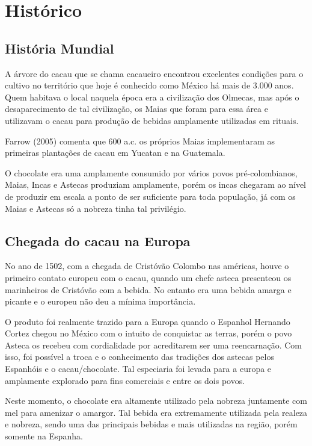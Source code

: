 \documentclass[
	12pt,				%
	openright,			%
	oneside,			%
	a4paper,			%
	english,			%
	french,				%
	spanish,			%
	brazil				%
	]{abntex2}
\begin{document}
\section{Histórico}

\subsection{História Mundial}

A árvore do cacau que se chama cacaueiro encontrou excelentes condições para o cultivo no território que hoje é conhecido como México há mais de 3.000 anos. Quem habitava o local naquela época era a civilização dos Olmecas, mas após o desaparecimento de tal civilização, os Maias que foram para essa área e utilizavam o cacau para produção de bebidas amplamente utilizadas em rituais. \cite{7}

Farrow (2005) comenta que 600 a.c. os próprios Maias implementaram as primeiras plantações de cacau em Yucatan e na Guatemala. \cite{7}

O chocolate era uma amplamente consumido por vários povos pré-colombianos, Maias, Incas e Astecas produziam amplamente, porém os incas chegaram ao nível de produzir em escala a ponto de ser suficiente para toda população, já com os Maias e Astecas só a nobreza tinha tal privilégio. 

\subsection{Chegada do cacau na Europa}

No ano de 1502, com a chegada de Cristóvão Colombo nas américas, houve o primeiro contato europeu com o cacau, quando um chefe asteca presenteou os marinheiros de Cristóvão com a bebida. No entanto era uma bebida amarga e picante e o europeu não deu a mínima importância. \cite{7}

O produto foi realmente trazido para a Europa quando o Espanhol Hernando Cortez chegou no México com o intuito de conquistar as terras, porém o povo Asteca os recebeu com cordialidade por acreditarem ser uma reencarnação. Com isso, foi possível a troca e o conhecimento das tradições dos astecas pelos Espanhóis e o cacau/chocolate. Tal especiaria foi levada para a europa e amplamente explorado para fins comerciais e entre os dois povos. \cite{7}

Neste momento, o chocolate era altamente utilizado pela nobreza juntamente com mel para amenizar o amargor. Tal bebida era extremamente utilizada pela realeza e nobreza, sendo uma das principais bebidas e mais utilizadas na região, porém somente na Espanha.
\end{document}
